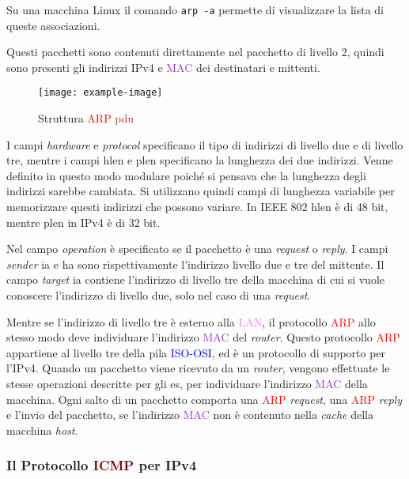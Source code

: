 \documentclass{article}
\numberwithin{equation}{subsection}
\begin{document}
Su una macchina Linux il comando \verb|arp -a| permette di visualizzare la lista di queste associazioni. 

Questi pacchetti sono contenuti direttamente nel pacchetto di livello 2, quindi sono presenti gli indirizzi \textcolor{BurntOrange}{IPv4} e \textcolor{DarkOrchid}{MAC} dei destinatari e mittenti. 

\begin{figure}[H]%
    \centering%
    \texttt{[image: example-image]}%
    \caption{Struttura \textcolor{Red}{ARP} \textcolor{Brown}{pdu}}%
\end{figure}

I campi \textit{hardware} e \textit{protocol} specificano il tipo di indirizzi di livello due e di livello tre, mentre i campi hlen e plen specificano la lunghezza dei due indirizzi. Venne 
definito in questo modo modulare poiché si pensava che la lunghezza degli indirizzi sarebbe cambiata. Si utilizzano quindi 
campi di lunghezza variabile per memorizzare questi indirizzi che possono variare. 
In IEEE 802 hlen è di 48 bit, mentre plen in \textcolor{BurntOrange}{IPv4} è di 32 bit. 

Nel campo \textit{operation} è specificato se il pacchetto è una \textit{request} o \textit{reply}. I campi \textit{sender} ia e ha sono rispettivamente l'indirizzo livello due e tre del mittente. Il campo \textit{target} ia contiene l'indirizzo di livello tre della macchina di cui si vuole conoscere l'indirizzo di livello due, solo nel caso di una \textit{request}. 

Mentre se l'indirizzo di livello tre è esterno alla \textcolor{violet}{LAN}, il protocollo \textcolor{Red}{ARP} allo stesso modo deve individuare l'indirizzo \textcolor{DarkOrchid}{MAC} del \textit{router}. Questo protocollo \textcolor{Red}{ARP} appartiene al livello tre della 
pila \textcolor{blue}{ISO-OSI}, ed è un protocollo di supporto per l'\textcolor{BurntOrange}{IPv4}. 
Quando un pacchetto viene ricevuto da un \textit{router}, vengono effettuate le stesse operazioni descritte per gli \textcolor{Periwinkle}{es}, per individuare l'indirizzo \textcolor{DarkOrchid}{MAC} della macchina. 
Ogni salto di un pacchetto comporta una \textcolor{Red}{ARP} \textit{request}, una \textcolor{Red}{ARP} \textit{reply} e l'invio del pacchetto, se l'indirizzo \textcolor{DarkOrchid}{MAC} non è contenuto nella \textit{cache} della macchina \textit{host}. 

\subsubsection{Il Protocollo \textcolor{Maroon}{ICMP} per \textcolor{BurntOrange}{IPv4}}
\end{document}
